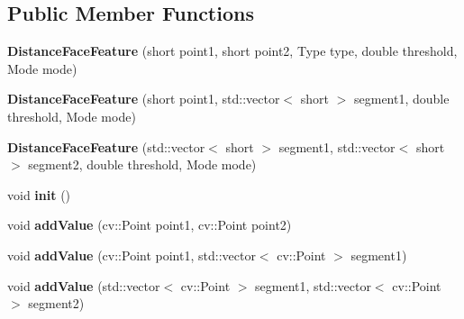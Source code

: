 \subsection*{Public Member Functions}
\begin{DoxyCompactItemize}
\item 
{\bfseries Distance\+Face\+Feature} (short point1, short point2, Type type, double threshold, Mode mode)\hypertarget{classinsight_1_1DistanceFaceFeature_a30ccc9050e0d8def0f26de4c8c0952c3}{}\label{classinsight_1_1DistanceFaceFeature_a30ccc9050e0d8def0f26de4c8c0952c3}

\item 
{\bfseries Distance\+Face\+Feature} (short point1, std\+::vector$<$ short $>$ segment1, double threshold, Mode mode)\hypertarget{classinsight_1_1DistanceFaceFeature_a32432031d9dfd599719e0c7152997f84}{}\label{classinsight_1_1DistanceFaceFeature_a32432031d9dfd599719e0c7152997f84}

\item 
{\bfseries Distance\+Face\+Feature} (std\+::vector$<$ short $>$ segment1, std\+::vector$<$ short $>$ segment2, double threshold, Mode mode)\hypertarget{classinsight_1_1DistanceFaceFeature_ac059fe0dc8d44d6f2a3ca1ca0586d6eb}{}\label{classinsight_1_1DistanceFaceFeature_ac059fe0dc8d44d6f2a3ca1ca0586d6eb}

\item 
void {\bfseries init} ()\hypertarget{classinsight_1_1DistanceFaceFeature_a5d4a406c254505e4f9bb1f1d8d47067f}{}\label{classinsight_1_1DistanceFaceFeature_a5d4a406c254505e4f9bb1f1d8d47067f}

\item 
void {\bfseries add\+Value} (cv\+::\+Point point1, cv\+::\+Point point2)\hypertarget{classinsight_1_1DistanceFaceFeature_aeb07d0b8f7336ce312aea243b16df019}{}\label{classinsight_1_1DistanceFaceFeature_aeb07d0b8f7336ce312aea243b16df019}

\item 
void {\bfseries add\+Value} (cv\+::\+Point point1, std\+::vector$<$ cv\+::\+Point $>$ segment1)\hypertarget{classinsight_1_1DistanceFaceFeature_a50e95d92ca510cc987e1679ec4d55c78}{}\label{classinsight_1_1DistanceFaceFeature_a50e95d92ca510cc987e1679ec4d55c78}

\item 
void {\bfseries add\+Value} (std\+::vector$<$ cv\+::\+Point $>$ segment1, std\+::vector$<$ cv\+::\+Point $>$ segment2)\hypertarget{classinsight_1_1DistanceFaceFeature_a0defb57d61b8a4c8db8250bffa468f9e}{}\label{classinsight_1_1DistanceFaceFeature_a0defb57d61b8a4c8db8250bffa468f9e}


\end{DoxyCompactItemize}
